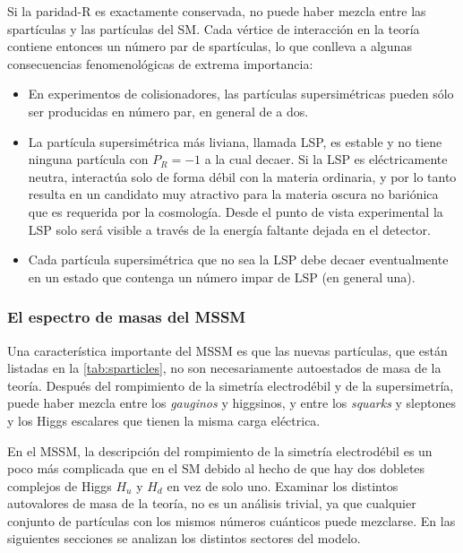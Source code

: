 Si la paridad-R es exactamente conservada, no puede haber mezcla entre las
spartículas y las partículas del SM. Cada vértice de interacción en la teoría
contiene entonces un número par de spartículas, lo que conlleva a algunas
consecuencias fenomenológicas de extrema importancia:

\begin{itemize}
\item En experimentos de colisionadores, las partículas supersimétricas pueden
  sólo ser producidas en número par, en general de a dos.
\item La partícula supersimétrica más liviana, llamada LSP, es estable y no tiene
  ninguna partícula con $P_R = -1$ a la cual decaer. Si
  la LSP es eléctricamente neutra, interactúa solo de forma débil con la materia
  ordinaria, y por lo tanto resulta en un candidato muy atractivo para la
  materia oscura no bariónica que es requerida por la cosmología. Desde el punto de
  vista experimental la LSP solo será visible a través de la energía faltante
  dejada en el detector.
\item Cada partícula supersimétrica que no sea la LSP debe decaer eventualmente
  en un estado que contenga un número impar de LSP (en general una).
\end{itemize}


\subsubsection{El espectro de masas del MSSM}
\label{sec:mssm_masses}

Una característica importante del MSSM es que las nuevas partículas, que están
listadas en la \cref{tab:sparticles}, no son necesariamente autoestados de masa
de la teoría. Después del rompimiento de la simetría electrodébil
y de la supersimetría, puede haber mezcla entre los \emph{gauginos} y higgsinos, y
entre los \emph{squarks} y sleptones y los Higgs escalares que tienen la misma carga
eléctrica.

En el MSSM, la descripción del rompimiento de la simetría electrodébil es un
poco más complicada que en el SM debido al hecho de que hay dos dobletes
complejos de Higgs $H_u$ y $H_d$ en vez de solo uno.
Examinar los distintos autovalores de masa de la teoría, no es un análisis
trivial, ya que cualquier conjunto de partículas con los mismos números
cuánticos puede mezclarse. En las siguientes secciones se analizan los distintos
sectores del modelo.


